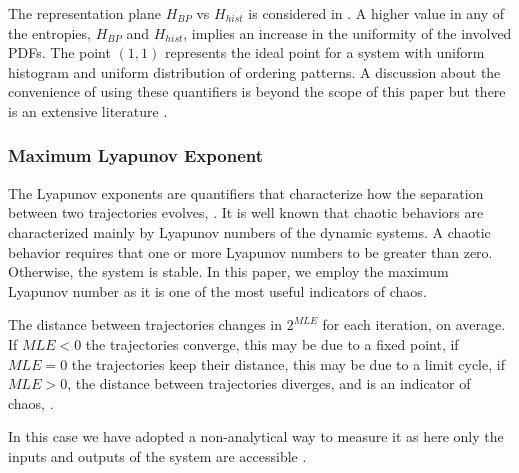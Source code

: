 The representation plane $H_{BP}$ vs $H_{hist}$ is considered in \cite{DeMicco2008}.
A higher value in any of the entropies, $H_{BP}$ and $H_{hist}$, implies an
increase in the uniformity of the involved PDFs. The point
$(1,1)$ represents the ideal point for a system with uniform histogram and
uniform distribution of ordering patterns.
A discussion about the convenience of using these quantifiers is beyond the scope of this paper but there is an extensive literature  \cite{DeMicco2008,Rosso2007C,Martin2006}.

\subsubsection{Maximum Lyapunov Exponent}
The Lyapunov exponents are quantifiers that characterize how the
separation between two trajectories evolves, \cite{Sprott2003}. It
is well known that chaotic behaviors are characterized
mainly by Lyapunov numbers of the dynamic systems. A chaotic behavior requires that one or more
Lyapunov numbers to be greater than zero. Otherwise, the system is stable. In this paper, we
employ the maximum Lyapunov number as it is one of the most useful
indicators of chaos.

The distance between trajectories changes in $2^{MLE}$ for each
iteration, on average. If $MLE<0$ the trajectories converge,
this may be due to a fixed point, if $MLE=0$ the trajectories keep
their distance, this may be due to a limit cycle, if $MLE>0$, the
distance between trajectories diverges, and is an indicator of
chaos, \cite{Strotgartz1994}.

In this case we have adopted a non-analytical way to measure it as here only the inputs and outputs of the system are accessible \cite{Sprott2003}.
